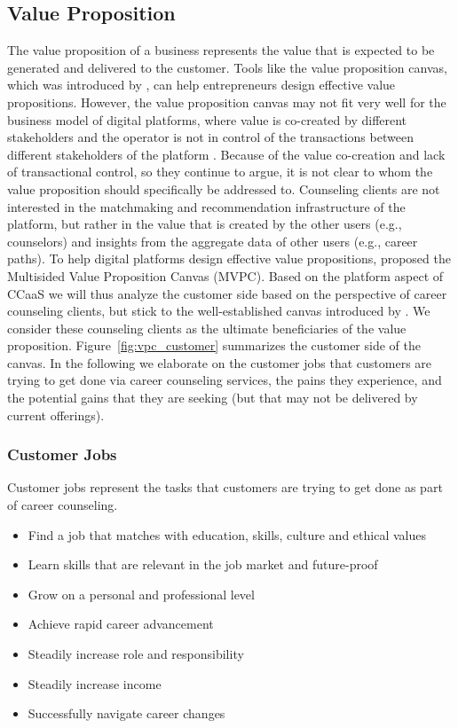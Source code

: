 \subsection{Value Proposition}


The value proposition of a business represents the value that is expected to be generated and delivered to the
customer. Tools like the value proposition canvas, which was introduced by \cite{osterwalderValuePropositionDesign2014},
can help entrepreneurs design effective value propositions. However, the value proposition canvas may not fit very well
for the business model of digital platforms, where value is co-created by different stakeholders and the operator is not
in control of the transactions between different stakeholders of the platform \citep{belleflammeMultisidedValueProposition2021}.
Because of the value co-creation and lack of transactional control, so they continue to argue, it is not clear to whom
the value proposition should specifically be addressed to. Counseling clients are not interested in the matchmaking
and recommendation infrastructure of the platform, but rather in the value that is created by the other users (e.g.,
counselors) and insights from the aggregate data of other users (e.g., career paths). To help digital platforms design
effective value propositions, \cite{belleflammeMultisidedValueProposition2021} proposed the Multisided Value Proposition
Canvas (MVPC). Based on the platform aspect of CCaaS we will thus analyze the customer side based on the perspective of career
counseling clients, but stick to the well-established canvas introduced by \cite{osterwalderValuePropositionDesign2014}. We
consider these counseling clients as the ultimate beneficiaries of the value proposition. Figure~\ref{fig:vpc_customer}
summarizes the customer side of the canvas. In the following we elaborate on the customer jobs that customers are trying
to get done via career counseling services, the pains they experience, and the potential gains that they are seeking
(but that may not be delivered by current offerings).

\subsubsection{Customer Jobs}

Customer jobs represent the tasks that customers are trying to get done as part of career counseling.

\begin{itemize}
    \item Find a job that matches with education, skills, culture and ethical values
    \item Learn skills that are relevant in the job market and future-proof
    \item Grow on a personal and professional level
    \item Achieve rapid career advancement
    \item Steadily increase role and responsibility
    \item Steadily increase income
    \item Successfully navigate career changes
\end{itemize}

